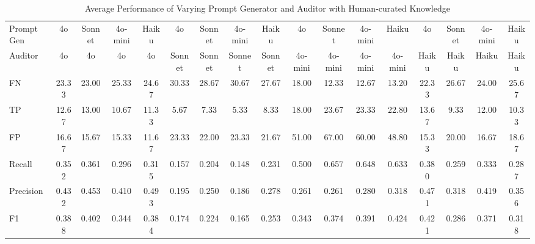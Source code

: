 \begin{table}
\caption{Average Performance of Varying Prompt Generator and Auditor with Human-curated Knowledge}
\label{table:aigenprompt}
\begin{adjustbox}{width=\textwidth}
\begin{tabular}{@{}l|cccc|cccc|cccc|cccc@{}}
\toprule
Prompt Gen & 4o    & Sonnet & 4o-mini & Haiku & 4o     & Sonnet & 4o-mini & Haiku  & 4o      & Sonnet  & 4o-mini & Haiku   & 4o    & Sonnet & 4o-mini & Haiku \\ 
Auditor          & 4o    & 4o     & 4o      & 4o    & Sonnet & Sonnet & Sonnet  & Sonnet & 4o-mini & 4o-mini & 4o-mini & 4o-mini & Haiku & Haiku  & Haiku   & Haiku \\ \midrule
FN               & 23.33 & 23.00  & 25.33   & 24.67 & 30.33  & 28.67  & 30.67   & 27.67  & 18.00   & 12.33   & 12.67   & 13.20   & 22.33 & 26.67  & 24.00   & 25.67 \\
TP               & 12.67 & 13.00  & 10.67   & 11.33 & 5.67   & 7.33   & 5.33    & 8.33   & 18.00   & 23.67   & 23.33   & 22.80   & 13.67 & 9.33   & 12.00   & 10.33 \\
FP               & 16.67 & 15.67  & 15.33   & 11.67 & 23.33  & 22.00  & 23.33   & 21.67  & 51.00   & 67.00   & 60.00   & 48.80   & 15.33 & 20.00  & 16.67   & 18.67 \\ \midrule
Recall           & 0.352 & 0.361  & 0.296   & 0.315 & 0.157  & 0.204  & 0.148   & 0.231  & 0.500   & 0.657   & 0.648   & 0.633   & 0.380 & 0.259  & 0.333   & 0.287 \\
Precision        & 0.432 & 0.453  & 0.410   & 0.493 & 0.195  & 0.250  & 0.186   & 0.278  & 0.261   & 0.261   & 0.280   & 0.318   & 0.471 & 0.318  & 0.419   & 0.356 \\
F1               & 0.388 & 0.402  & 0.344   & 0.384 & 0.174  & 0.224  & 0.165   & 0.253  & 0.343   & 0.374   & 0.391   & {\color[HTML]{C834FC} 0.424}   & {\color[HTML]{C834FC} 0.421} & 0.286  & 0.371   & 0.318 \\ \bottomrule
\end{tabular}
\end{adjustbox}
\end{table}


